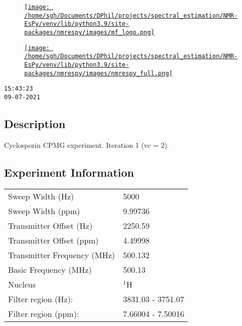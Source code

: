 \documentclass[8pt]{article}
\begin{document}
\begin{figure}[!ht]
\begin{minipage}[b][2.5cm][c]{.72\textwidth}
\href{http://foroozandeh.chem.ox.ac.uk/home}%
{\texttt{[image: /home/sgh/Documents/DPhil/projects/spectral\_estimation/NMR-EsPy/venv/lib/python3.9/site-packages/nmrespy/images/mf\_logo.png]}}
\end{minipage}
\begin{minipage}[b][2.5cm][c]{.27\textwidth}
\href{https://foroozandehgroup.github.io/NMR-EsPy}%
{\texttt{[image: /home/sgh/Documents/DPhil/projects/spectral\_estimation/NMR-EsPy/venv/lib/python3.9/site-packages/nmrespy/images/nmrespy\_full.png]}}
\end{minipage}
\end{figure}

\texttt{15:43:23\\09-07-2021}

\subsection*{Description}
Cyclosporin CPMG experiment.
Iteration 1 (vc = 2)

\subsection*{Experiment Information}
\hspace{-6pt}
\begin{tabular}{ll}
Sweep Width (Hz) & 5000 \\
Sweep Width (ppm) & 9.99736 \\
Transmitter Offset (Hz) & 2250.59 \\
Transmitter Offset (ppm) & 4.49998 \\
Transmitter Frequency (MHz) & 500.132 \\
Basic Frequency (MHz) & 500.13 \\
Nucleus & $^{1}$H \\
Filter region (Hz): & 3831.03 - 3751.07 \\
Filter region (ppm): & 7.66004 - 7.50016 \\

\end{tabular}
\end{document}
